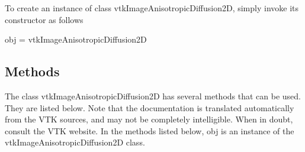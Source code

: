 To create an instance of class vtk\-Image\-Anisotropic\-Diffusion2\-D, simply invoke its constructor as follows \begin{DoxyVerb}  obj = vtkImageAnisotropicDiffusion2D
\end{DoxyVerb}
 \hypertarget{vtkwidgets_vtkxyplotwidget_Methods}{}\subsection{Methods}\label{vtkwidgets_vtkxyplotwidget_Methods}
The class vtk\-Image\-Anisotropic\-Diffusion2\-D has several methods that can be used. They are listed below. Note that the documentation is translated automatically from the V\-T\-K sources, and may not be completely intelligible. When in doubt, consult the V\-T\-K website. In the methods listed below, {\ttfamily obj} is an instance of the vtk\-Image\-Anisotropic\-Diffusion2\-D class. 

